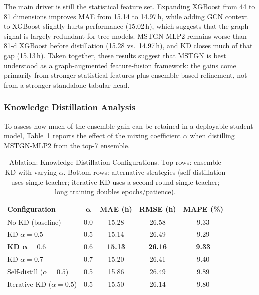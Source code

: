 \documentclass[sigconf,anonymous]{acmart}%
\begin{document}
The main driver is still the statistical feature set. Expanding XGBoost from 44 to 81 dimensions improves MAE from 15.14 to 14.97\,h, while adding GCN context to XGBoost slightly hurts performance (15.02\,h), which suggests that the graph signal is largely redundant for tree models. MSTGN-MLP2 remains worse than 81-d XGBoost before distillation (15.28 vs.\ 14.97\,h), and KD closes much of that gap (15.13\,h). Taken together, these results suggest that MSTGN is best understood as a graph-augmented feature-fusion framework: the gains come primarily from stronger statistical features plus ensemble-based refinement, not from a stronger standalone tabular head.

\subsubsection{Knowledge Distillation Analysis}
\label{sec:kd_ablation}

To assess how much of the ensemble gain can be retained in a deployable student model, Table~\ref{tab:kd_ablation} reports the effect of the mixing coefficient $\alpha$ when distilling MSTGN-MLP2 from the top-7 ensemble.

\begin{table}[t]
    \centering
    \caption{Ablation: Knowledge Distillation Configurations. Top rows: ensemble KD with varying $\alpha$. Bottom rows: alternative strategies (self-distillation uses single teacher; iterative KD uses a second-round single teacher; long training doubles epochs/patience).}
    \label{tab:kd_ablation}
    \begin{tabular}{lcccc}
        \toprule
        \textbf{Configuration} & $\boldsymbol{\alpha}$ & \textbf{MAE (h)} & \textbf{RMSE (h)} & \textbf{MAPE (\%)} \\
        \midrule
        No KD (baseline)  & 0.0 & 15.28 & 26.58 & 9.33 \\
        KD $\alpha{=}0.5$ & 0.5 & 15.14 & 26.49 & 9.29 \\
        \textbf{KD $\boldsymbol{\alpha{=}0.6}$} & 0.6 & \textbf{15.13} & \textbf{26.16} & \textbf{9.33} \\
        KD $\alpha{=}0.7$ & 0.7 & 15.20 & 26.41 & 9.40 \\
        \midrule
        Self-distill ($\alpha{=}0.5$) & 0.5 & 15.86 & 26.49 & 9.89 \\
        Iterative KD ($\alpha{=}0.5$) & 0.5 & 15.50 & 26.14 & 9.80 \\
        \bottomrule
    \end{tabular}
\end{table}
\end{document}
